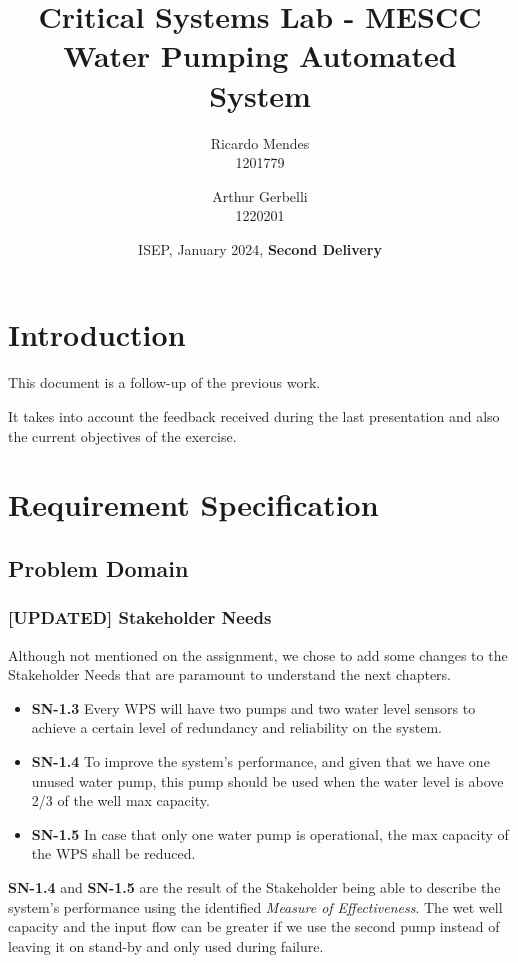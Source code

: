 \documentclass[11pt]{article}
\title{\textbf{Critical Systems Lab - MESCC\\ Water Pumping Automated System}}
\date{ISEP, January 2024, \textbf{Second Delivery}}
\author{Ricardo Mendes\\ 1201779
\and Arthur Gerbelli\\ 1220201}
\begin{document}
\maketitle              
\newpage
\tableofcontents
\newpage

%
\section{Introduction}

This document is a follow-up of the previous work.

It takes into account the feedback received during the last presentation and also the current objectives of the exercise.

\section{Requirement Specification}

\subsection{Problem Domain}

\subsubsection{[UPDATED] Stakeholder Needs}

Although not mentioned on the assignment, we chose to add some changes to the Stakeholder Needs that are paramount to understand the next chapters.

\begin{itemize}
	\item \textbf{SN-1.3} Every WPS will have two pumps and two water level sensors to achieve a certain level of redundancy and reliability on the system.
	\item \textbf{SN-1.4} To improve the system's performance, and given that we have one unused water pump, this pump should be used when the water level is above 2/3 of the well max capacity.
	\item \textbf{SN-1.5} In case that only one water pump is operational, the max capacity of the WPS shall be reduced.
\end{itemize}

\textbf{SN-1.4} and \textbf{SN-1.5} are the result of the Stakeholder being able to describe the system's performance using the identified \textit{Measure of Effectiveness}. The wet well capacity and the input flow can be greater if we use the second pump instead of leaving it on stand-by and only used during failure.
\end{document}
